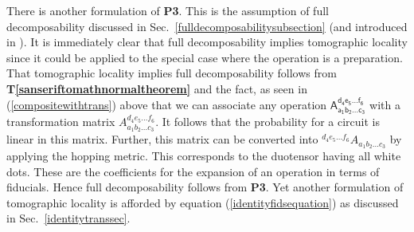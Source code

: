 \documentclass[10pt]{article}
\begin{document}
There is another formulation of {\bf P3}.  This is the assumption of full decomposability discussed in Sec.\ \ref{fulldecomposabilitysubsection} (and introduced in \cite{hardy2010formalism}).  It is immediately clear that full decomposability implies tomographic locality since it could be applied to the special case where the operation is a preparation.  That  tomographic locality implies full decomposability follows from {\bf T\ref{sanseriftomathnormaltheorem}} and the fact, as seen in (\ref{compositewithtrans}) above that we can associate any operation $\mathsf{A_{a_1b_2\dots c_3}^{d_4e_5\dots f_6}}$ with a transformation matrix $A_{a_1b_2\dots c_3}^{d_4e_5\dots f_6}$.  It follows that the probability for a circuit is linear in this matrix.  Further, this matrix can be converted into
${}^{d_4e_5\dots f_6}\!A_{a_1b_2\dots c_3}$ by applying the hopping metric. This corresponds to the duotensor having all white dots. These are the coefficients for the expansion of an operation in terms of fiducials.  Hence full decomposability follows from {\bf P3}.  Yet another formulation of tomographic locality is afforded by equation (\ref{identityfidsequation}) as discussed in Sec.\ \ref{identitytranssec}.
\end{document}
